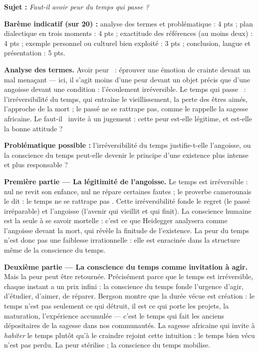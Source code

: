 \documentclass[11pt]{article}
\newcommand{\cle}[1]{{\popxbold\color{popdark}#1}}
\begin{document}
\begin{corrige}

\textbf{Sujet :} \emph{Faut-il avoir peur du temps qui passe ?}

\tcblower

\textbf{Barème indicatif (sur 20) :} analyse des termes et problématique : 4 pts ; plan dialectique en trois moments : 4 pts ; exactitude des références (au moins deux) : 4 pts ; exemple personnel ou culturel bien exploité : 3 pts ; conclusion, langue et présentation : 5 pts.

\textbf{Analyse des termes.} \guillemotleft Avoir peur \guillemotright\ : éprouver une émotion de crainte devant un mal menaçant — ici, il s'agit moins d'une peur devant un objet précis que d'une \cle{angoisse} devant une condition : l'écoulement irréversible. \guillemotleft Le temps qui passe \guillemotright\ : l'irréversibilité du temps, qui entraîne le vieillissement, la perte des êtres aimés, l'approche de la mort ; le passé ne se rattrape pas, comme le rappelle la sagesse africaine. Le \guillemotleft faut-il \guillemotright\ invite à un jugement : cette peur est-elle légitime, et est-elle la bonne attitude ?

\textbf{Problématique possible :} l'irréversibilité du temps justifie-t-elle l'angoisse, ou la conscience du temps peut-elle devenir le principe d'une existence plus intense et plus responsable ?

\textbf{Première partie — La légitimité de l'angoisse.} Le temps est irréversible : nul ne revit son enfance, nul ne répare certaines fautes ; le proverbe camerounais le dit : \guillemotleft le temps ne se rattrape pas \guillemotright. Cette irréversibilité fonde le regret (le passé irréparable) et l'angoisse (l'avenir qui vieillit et qui finit). La conscience humaine est la seule à se savoir mortelle : c'est ce que Heidegger analysera comme l'angoisse devant la mort, qui révèle la finitude de l'existence. La peur du temps n'est donc pas une faiblesse irrationnelle : elle est enracinée dans la structure même de la conscience du temps.

\textbf{Deuxième partie — La conscience du temps comme invitation à agir.} Mais la peur peut être retournée. Précisément parce que le temps est irréversible, chaque instant a un prix infini : la conscience du temps fonde l'urgence d'agir, d'étudier, d'aimer, de réparer. Bergson montre que la durée vécue est création : le temps n'est pas seulement ce qui détruit, il est ce qui porte les projets, la maturation, l'expérience accumulée — c'est le temps qui fait les anciens dépositaires de la sagesse dans nos communautés. La sagesse africaine qui invite à \emph{habiter} le temps plutôt qu'à le craindre rejoint cette intuition : le temps bien vécu n'est pas perdu. La peur stérilise ; la conscience du temps mobilise.


\end{corrige}
\end{document}
